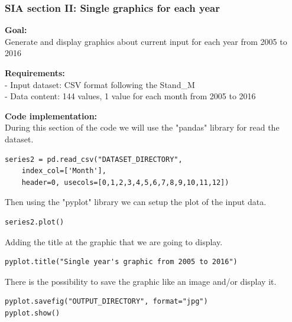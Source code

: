 \newpage
\subsubsection{SIA section II: Single graphics for each year}

\textbf{Goal:}\\
Generate and display graphics about current input for each year from 2005 to 2016

\textbf{Requirements:}\\
- Input dataset: CSV format following the Stand\_M \\
- Data content: 144 values, 1 value for each month from 2005 to 2016

\textbf{Code implementation:}\\
During this section of the code we will use the "pandas" library for read the dataset.
\begin{lstlisting}
series2 = pd.read_csv("DATASET_DIRECTORY", 
	index_col=['Month'], 
	header=0, usecols=[0,1,2,3,4,5,6,7,8,9,10,11,12])
\end{lstlisting}

Then using the "pyplot" library we can setup the plot of the input data.
\begin{lstlisting}
series2.plot()
\end{lstlisting}

Adding the title at the graphic that we are going to display.
\begin{lstlisting}
pyplot.title("Single year's graphic from 2005 to 2016")
\end{lstlisting}

There is the possibility to save the graphic like an image and/or display it.
\begin{lstlisting}
pyplot.savefig("OUTPUT_DIRECTORY", format="jpg")
pyplot.show()
\end{lstlisting}


